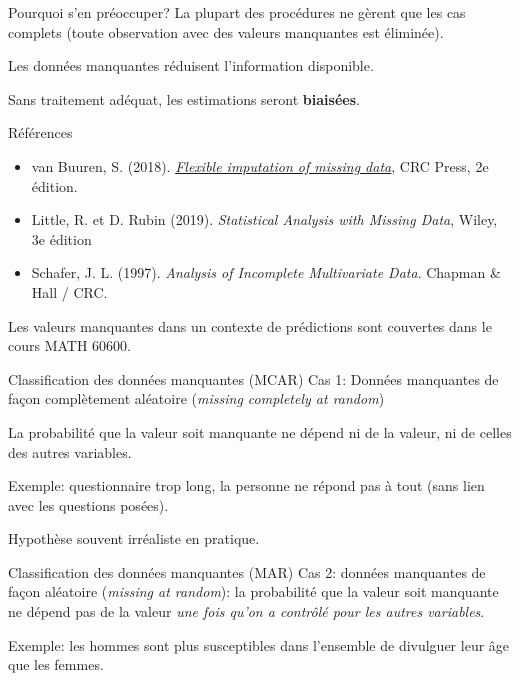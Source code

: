 \documentclass[
  ignorenonframetext,
]{beamer}
\providecommand{\tightlist}{%
  \setlength{\itemsep}{0pt}\setlength{\parskip}{0pt}}\usepackage{longtable,booktabs,array}
\begin{document}
\begin{frame}{Pourquoi s'en préoccuper?}
\protect\hypertarget{pourquoi-sen-pruxe9occuper}{}
La plupart des procédures ne gèrent que les cas complets (toute
observation avec des valeurs manquantes est éliminée).

Les données manquantes réduisent l'information disponible.

Sans traitement adéquat, les estimations seront \textbf{biaisées}.
\end{frame}

\begin{frame}{Références}
\protect\hypertarget{ruxe9fuxe9rences}{}
\begin{itemize}
\tightlist
\item
  van Buuren, S. (2018).
  \href{https://stefvanbuuren.name/fimd/}{\emph{Flexible imputation of
  missing data}}, CRC Press, 2e édition.
\item
  Little, R. et D. Rubin (2019). \emph{Statistical Analysis with Missing
  Data}, Wiley, 3e édition
\item
  Schafer, J. L. (1997). \emph{Analysis of Incomplete Multivariate
  Data}. Chapman \& Hall / CRC.
\end{itemize}

Les valeurs manquantes dans un contexte de prédictions sont couvertes
dans le cours MATH 60600.
\end{frame}

\begin{frame}{Classification des données manquantes (MCAR)}
\protect\hypertarget{classification-des-donnuxe9es-manquantes-mcar}{}
Cas 1: Données manquantes de façon complètement aléatoire (\emph{missing
completely at random})

La probabilité que la valeur soit manquante ne dépend ni de la valeur,
ni de celles des autres variables.

Exemple: questionnaire trop long, la personne ne répond pas à tout (sans
lien avec les questions posées).

Hypothèse souvent irréaliste en pratique.
\end{frame}

\begin{frame}{Classification des données manquantes (MAR)}
\protect\hypertarget{classification-des-donnuxe9es-manquantes-mar}{}
Cas 2: données manquantes de façon aléatoire (\emph{missing at random}):
la probabilité que la valeur soit manquante ne dépend pas de la valeur
\emph{une fois qu'on a contrôlé pour les autres variables}.

Exemple: les hommes sont plus susceptibles dans l'ensemble de divulguer
leur âge que les femmes.
\end{frame}
\end{document}
